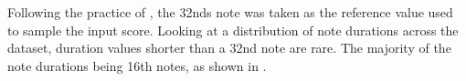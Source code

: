 
Following the practice of \textcite{micchi2020not}, the
\glspl{32nd} note was taken as the reference value used to
sample the input score. Looking at a distribution of note
durations across the dataset, duration values shorter than a
\gls{32nd} note are rare. The majority of the note durations
being \gls{16th} notes, as shown in
.


